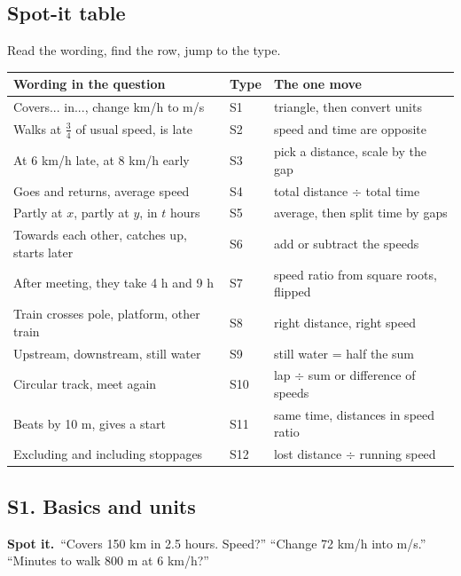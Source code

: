 \documentclass[11pt,a4paper]{article}
\let\oldsubsection\subsection
\renewcommand{\subsection}{\needspace{9\baselineskip}\oldsubsection}
\newcommand{\spot}{\textbf{\color{ember}Spot it.}\ }
\begin{document}
\subsection*{Spot-it table}
Read the wording, find the row, jump to the type.
\begin{center}\small\renewcommand{\arraystretch}{1.18}\setlength{\tabcolsep}{7pt}
\begin{tabularx}{\linewidth}{@{}>{\raggedright\arraybackslash}X l >{\raggedright\arraybackslash}X@{}}
\toprule
\textbf{\color{slate}Wording in the question} & \textbf{\color{slate}Type} & \textbf{\color{slate}The one move} \\ \midrule
Covers... in..., change km/h to m/s & S1 & triangle, then convert units \\
Walks at $\tfrac34$ of usual speed, is late & S2 & speed and time are opposite \\
At 6 km/h late, at 8 km/h early & S3 & pick a distance, scale by the gap \\
Goes and returns, average speed & S4 & total distance $\div$ total time \\
Partly at $x$, partly at $y$, in $t$ hours & S5 & average, then split time by gaps \\
Towards each other, catches up, starts later & S6 & add or subtract the speeds \\
After meeting, they take 4 h and 9 h & S7 & speed ratio from square roots, flipped \\
Train crosses pole, platform, other train & S8 & right distance, right speed \\
Upstream, downstream, still water & S9 & still water = half the sum \\
Circular track, meet again & S10 & lap $\div$ sum or difference of speeds \\
Beats by 10 m, gives a start & S11 & same time, distances in speed ratio \\
Excluding and including stoppages & S12 & lost distance $\div$ running speed \\
\bottomrule
\end{tabularx}\end{center}

\subsection{S1. Basics and units}
\spot ``Covers 150 km in 2.5 hours. Speed?'' ``Change 72 km/h into m/s.'' ``Minutes to walk 800 m at 6 km/h?''
\end{document}
